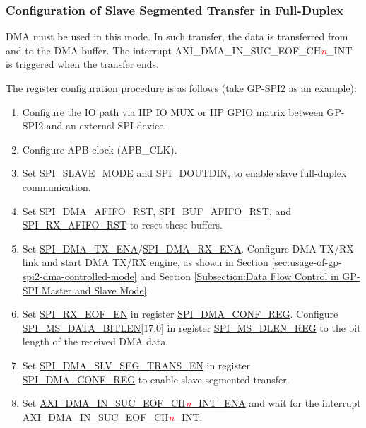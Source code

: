 \documentclass[main\_\_EN.tex]{subfiles}
\begin{document}
\subsubsection{Configuration of Slave Segmented Transfer in Full-Duplex}\label{sec:gp-spi2-slave-fd-seg-trans}
DMA must be used in this mode. In such transfer, the data is transferred from and to the DMA buffer. The interrupt AXI\_DMA\_IN\_SUC\_EOF\_CH\textcolor{red}{\it{n}}\_INT  is triggered when the transfer ends.

The register configuration procedure is as follows (take GP-SPI2 as an example):

\begin{enumerate}
   \item Configure the IO path via HP IO MUX or HP GPIO matrix between GP-SPI2 and an external SPI device.
   \item Configure APB clock (APB\_CLK).

    \item Set \hyperref[fielddesc:SPISLAVEMODE]{SPI\_SLAVE\_MODE} and \hyperref[fielddesc:SPIDOUTDIN]{SPI\_DOUTDIN}, to enable slave full-duplex communication.

    \item Set \hyperref[fielddesc:SPIDMAAFIFORST]{SPI\_DMA\_AFIFO\_RST}, \hyperref[fielddesc:SPIBUFAFIFORST]{SPI\_BUF\_AFIFO\_RST}, and \hyperref[fielddesc:SPIRXAFIFORST]{SPI\_RX\_AFIFO\_RST} to reset these buffers.

    \item Set \hyperref[fielddesc:SPIDMATXENA]{SPI\_DMA\_TX\_ENA}/\hyperref[fielddesc:SPIDMARXENA]{SPI\_DMA\_RX\_ENA}. Configure DMA TX/RX link and start DMA TX/RX engine, as shown in Section \ref{sec:usage-of-gp-spi2-dma-controlled-mode} and Section \ref{Subsection:Data Flow Control in GP-SPI Master and Slave Mode}.

    \item Set \hyperref[fielddesc:SPIRXEOFEN]{SPI\_RX\_EOF\_EN} in register \hyperref[regdesc:SPIDMACONFREG]{SPI\_DMA\_CONF\_REG}. Configure \hyperref[fielddesc:SPIMSDATABITLEN]{SPI\_MS\_DATA\_BITLEN}[17:0] in register \hyperref[regdesc:SPIMSDLENREG]{SPI\_MS\_DLEN\_REG} to the bit length of the received DMA data.

    \item Set \hyperref[fielddesc:SPIDMASLVSEGTRANSEN]{SPI\_DMA\_SLV\_SEG\_TRANS\_EN}  in register \hyperref[regdesc:SPIDMACONFREG]{SPI\_DMA\_CONF\_REG} to enable slave segmented transfer.

    \item Set \hyperref[fielddesc:AXIDMAINSUCEOFCHNINTENA]{AXI\_DMA\_IN\_SUC\_EOF\_CH\textcolor{red}{\it{n}}\_INT\_ENA} and wait for the interrupt \hyperref[int:GDMAINSUCEOFINT]{AXI\_DMA\_IN\_SUC\_EOF\_CH\textcolor{red}{\it{n}}\_INT}.
\end{enumerate}
\end{document}
